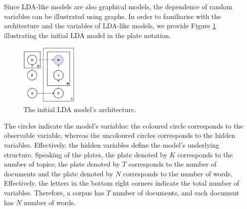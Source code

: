 \documentclass{mpaper}
\begin{document}
\par Since LDA-like models are also graphical models, the dependence of random variables can be illustrated using graphs. In order to familiarise with the architecture and the variables of LDA-like models, we provide Figure \ref{fig:arch_LDA-init} illustrating the initial LDA model in the plate notation.
\begin{figure}[h]
  \centering
  \includegraphics[width=0.25\textwidth]{LDA-initial.png}
  \caption{The initial LDA model's architecture.}
  \label{fig:arch_LDA-init}
\end{figure}
The circles indicate the model's variables: the coloured circle corresponds to the observable variable, whereas the uncoloured circles corresponds to the hidden variables. Effectively, the hidden variables define the model's underlying structure. Speaking of the plates, the plate denoted by $K$ corresponds to the number of topics; the plate denoted by $T$ corresponds to the number of documents and the plate denoted by $N$ corresponds to the number of words. Effectively, the letters in the bottom right corners indicate the total number of variables. Therefore, a corpus has $T$ number of documents, and each document has $N$ number of words.
\end{document}
